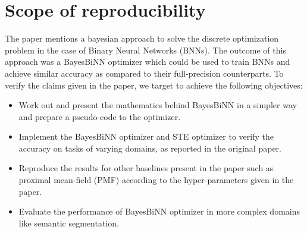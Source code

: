\section{Scope of reproducibility}
The paper mentions a bayesian approach to solve the discrete optimization problem in the case of Binary Neural Networks (BNNs). The outcome of this approach was a BayesBiNN optimizer which could be used to train BNNs and achieve similar accuracy as compared to their full-precision counterparts. To verify the claims given in the paper, we target to achieve the following objectives:

\begin{itemize}
    \item Work out and present the mathematics behind BayesBiNN in a simpler way and prepare a pseudo-code to the optimizer.
    \item Implement the BayesBiNN optimizer and STE optimizer to verify the accuracy on tasks of varying domains, as reported in the original paper.
    \item Reproduce the results for other baselines present in the paper such as proximal mean-field (PMF) according to the hyper-parameters given in the paper.
    \item Evaluate the performance of BayesBiNN optimizer in more complex domains like semantic segmentation.
\end{itemize}